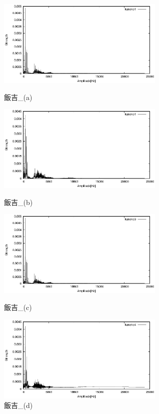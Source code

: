 \documentclass[titlepage]{jarticle}
\begin{document}
\begin{figure}[H]
  \begin{minipage}{0.495\hsize}
    \centering
    \includegraphics[width=8cm]{img/kanako1.eps}
    \caption{飯吉\_(a)}
    \label{kanako1}
  \end{minipage}
  \begin{minipage}{0.495\hsize}
    \centering
    \includegraphics[width=8cm]{img/kanako2.eps}
    \caption{飯吉\_(b)}
    \label{kanako2}
  \end{minipage}

  \begin{minipage}{0.495\hsize}
    \centering
    \includegraphics[width=8cm]{img/kanako3.eps}
    \caption{飯吉\_(c)}
    \label{kanako3}
  \end{minipage}
  \begin{minipage}{0.495\hsize}
    \centering
    \includegraphics[width=8cm]{img/kanako4.eps}
    \caption{飯吉\_(d)}
    \label{kanako4}
  \end{minipage}
\end{figure}
\end{document}
